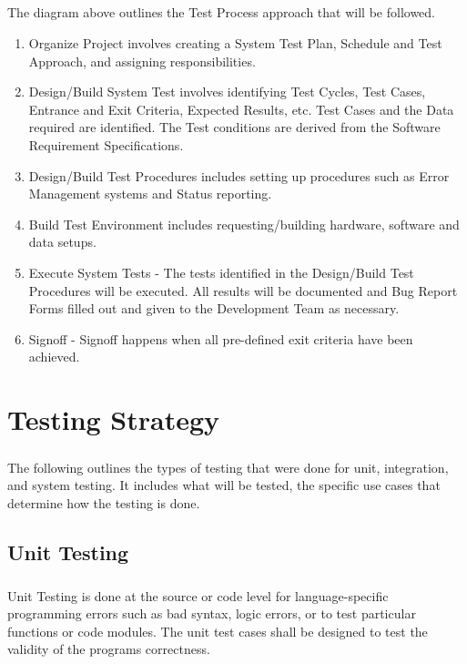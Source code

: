 \documentclass[a4paper,10pt]{scrreprt}
\begin{document}
\paragraph{}
The diagram above outlines the Test Process approach that will be followed.
\begin{enumerate}
    \item Organize Project involves creating a System Test Plan, Schedule and Test Approach, and assigning responsibilities.
    \item Design/Build System Test involves identifying Test Cycles, Test Cases, Entrance and Exit Criteria, Expected Results, etc. Test Cases and the Data required are identified. The Test conditions are derived from the Software Requirement Specifications.
    \item Design/Build Test Procedures includes setting up procedures such as Error Management systems and Status reporting.
    \item Build Test Environment includes requesting/building hardware, software and data setups.
    \item Execute System Tests - The tests identified in the Design/Build Test Procedures will be executed. All results will be documented and Bug Report Forms filled out and given to the Development Team as necessary.
    \item Signoff - Signoff happens when all pre-defined exit criteria have been achieved.
\end{enumerate}
\chapter{Testing Strategy}
\paragraph{}
The following outlines the types of testing that were done for unit, integration, and system testing. It includes what will be tested, the specific use cases that determine how the testing is done.
\section{Unit Testing}
\paragraph{}
Unit Testing is done at the source or code level for language-specific programming errors such
as bad syntax, logic errors, or to test particular functions or code modules. The unit test cases
shall be designed to test the validity of the programs correctness.
\end{document}
